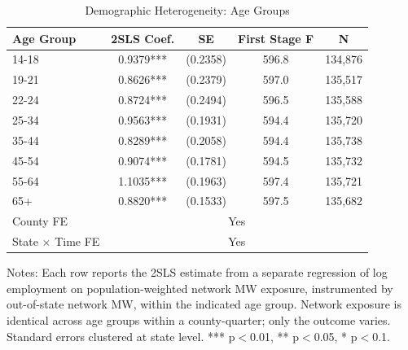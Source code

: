 \begin{table}[H]
\centering
\caption{Demographic Heterogeneity: Age Groups}
\label{tab:agehet}
\small
\begin{tabular}{l cccc}
\toprule
Age Group & 2SLS Coef. & SE & First Stage F & N \\
\midrule
14-18 & 0.9379*** & (0.2358) & 596.8 & 134,876 \\
19-21 & 0.8626*** & (0.2379) & 597.0 & 135,517 \\
22-24 & 0.8724*** & (0.2494) & 596.5 & 135,588 \\
25-34 & 0.9563*** & (0.1931) & 594.4 & 135,720 \\
35-44 & 0.8289*** & (0.2058) & 594.4 & 135,738 \\
45-54 & 0.9074*** & (0.1781) & 594.5 & 135,732 \\
55-64 & 1.1035*** & (0.1963) & 597.4 & 135,721 \\
65+ & 0.8820*** & (0.1533) & 597.5 & 135,682 \\
\midrule
County FE & \multicolumn{4}{c}{Yes} \\
State $\times$ Time FE & \multicolumn{4}{c}{Yes} \\
\bottomrule
\end{tabular}
\begin{figurenotes}
Notes: Each row reports the 2SLS estimate from a separate regression of log employment on 
population-weighted network MW exposure, instrumented by out-of-state network MW, 
within the indicated age group. Network exposure is identical across age groups within 
a county-quarter; only the outcome varies. Standard errors clustered at state level. 
*** p$<$0.01, ** p$<$0.05, * p$<$0.1.
\end{figurenotes}
\end{table}
